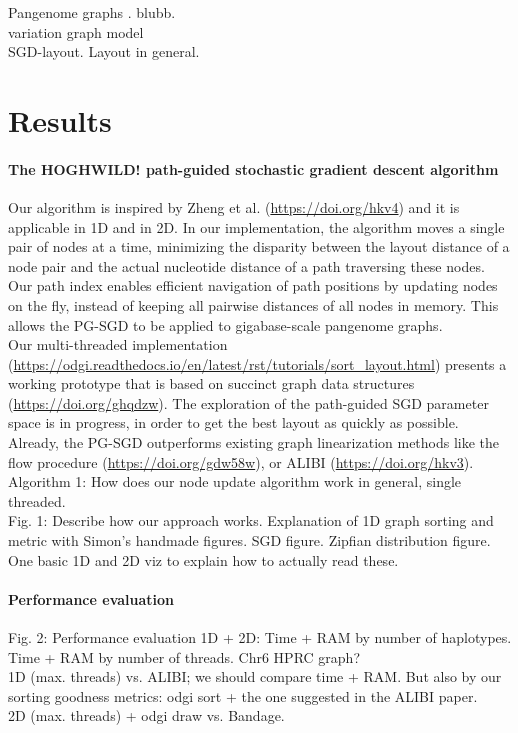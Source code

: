 \documentclass[11pt,hidelinks]{article}
\begin{document}
Pangenome graphs \cite{computational2016computational}. blubb.
\\
variation graph model
\\
SGD-layout. Layout in general. 
\\
\section{Results}

\paragraph{The HOGHWILD! path-guided stochastic gradient descent algorithm}
Our algorithm is inspired by Zheng et al. (\url{https://doi.org/hkv4}) and it is applicable in 1D and in 2D. In our implementation, the algorithm moves a single pair of nodes at a time, minimizing the disparity between the layout distance of a node pair and the actual nucleotide distance of a path traversing these nodes. Our path index enables efficient navigation of path positions by updating nodes on the fly, instead of keeping all pairwise distances of all nodes in memory. This allows the PG-SGD to be applied to gigabase-scale pangenome graphs. \\
Our multi-threaded implementation (\url{https://odgi.readthedocs.io/en/latest/rst/tutorials/sort_layout.html}) presents a working prototype that is based on succinct graph data structures (\url{https://doi.org/ghqdzw}). The exploration of the path-guided SGD parameter space is in progress, in order to get the best layout as quickly as possible. Already, the PG-SGD outperforms existing graph linearization methods like the flow procedure (\url{https://doi.org/gdw58w}), or ALIBI (\url{https://doi.org/hkv3}).
\\
Algorithm 1: How does our node update algorithm work in general, single threaded.
\\
Fig. 1: Describe how our approach works. Explanation of 1D graph sorting and metric with Simon's handmade figures. SGD figure. Zipfian distribution figure. One basic 1D and 2D viz to explain how to actually read these.
\paragraph{Performance evaluation}
Fig. 2: Performance evaluation 1D + 2D: Time + RAM by number of haplotypes. Time + RAM by number of threads. Chr6 HPRC graph?
\\
1D (max. threads) vs. ALIBI; we should compare time + RAM. But also by our sorting goodness metrics: odgi sort + the one suggested in the ALIBI paper. 
\\
2D (max. threads) + odgi draw vs. Bandage.
\end{document}
